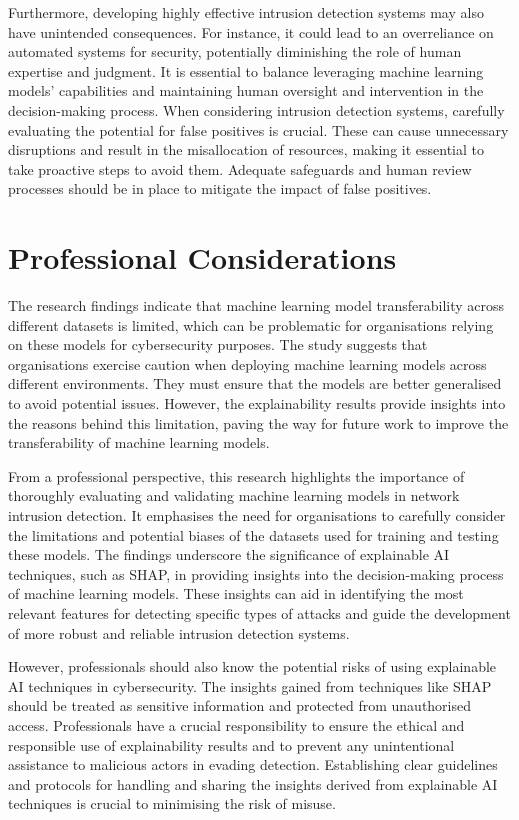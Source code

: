 Furthermore, developing highly effective intrusion detection systems may also have unintended consequences. For instance, it could lead to an overreliance on automated systems for security, potentially diminishing the role of human expertise and judgment. It is essential to balance leveraging machine learning models' capabilities and maintaining human oversight and intervention in the decision-making process. When considering intrusion detection systems, carefully evaluating the potential for false positives is crucial. These can cause unnecessary disruptions and result in the misallocation of resources, making it essential to take proactive steps to avoid them. Adequate safeguards and human review processes should be in place to mitigate the impact of false positives.

\section{Professional Considerations}
The research findings indicate that machine learning model transferability across different datasets is limited, which can be problematic for organisations relying on these models for cybersecurity purposes. The study suggests that organisations exercise caution when deploying machine learning models across different environments. They must ensure that the models are better generalised to avoid potential issues. However, the explainability results provide insights into the reasons behind this limitation, paving the way for future work to improve the transferability of machine learning models.

From a professional perspective, this research highlights the importance of thoroughly evaluating and validating machine learning models in network intrusion detection. It emphasises the need for organisations to carefully consider the limitations and potential biases of the datasets used for training and testing these models. The findings underscore the significance of explainable AI techniques, such as SHAP, in providing insights into the decision-making process of machine learning models. These insights can aid in identifying the most relevant features for detecting specific types of attacks and guide the development of more robust and reliable intrusion detection systems.

However, professionals should also know the potential risks of using explainable AI techniques in cybersecurity. The insights gained from techniques like SHAP should be treated as sensitive information and protected from unauthorised access. Professionals have a crucial responsibility to ensure the ethical and responsible use of explainability results and to prevent any unintentional assistance to malicious actors in evading detection. Establishing clear guidelines and protocols for handling and sharing the insights derived from explainable AI techniques is crucial to minimising the risk of misuse.

